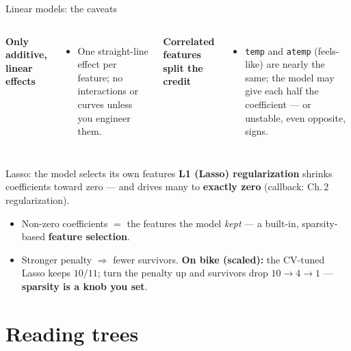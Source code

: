 \documentclass[aspectratio=169]{beamer}
\begin{document}
\begin{frame}{Linear models: the caveats}
  \begin{columns}[T]
    \textbf{Only additive, linear effects}
    \begin{itemize}\small
      \item One straight-line effect per feature; no interactions or curves unless you engineer them.
    \end{itemize}
    \vskip 4pt
    \textbf{Correlated features split the credit}
    \begin{itemize}\small
      \item \texttt{temp} and \texttt{atemp} (feels-like) are nearly the same; the model may give
        each half the coefficient --- or unstable, even opposite, signs.
    \end{itemize}
  \end{columns}
\end{frame}

\begin{frame}{Lasso: the model selects its own features}
  \textbf{L1 (Lasso) regularization} shrinks coefficients toward zero --- and drives many to
  \textbf{exactly zero} (callback: Ch.\,2 regularization).
  \vfill
  \begin{itemize}\small
    \item Non-zero coefficients $=$ the features the model \emph{kept} --- a built-in,
      sparsity-based \textbf{feature selection}.
    \item Stronger penalty $\Rightarrow$ fewer survivors. \textbf{On bike (scaled):} the
      CV-tuned Lasso keeps $10/11$; turn the penalty up and survivors drop $10 \to 4 \to 1$ ---
      \textbf{sparsity is a knob you set}.
  \end{itemize}
  \vfill
\end{frame}

\section{Reading trees}
\end{document}
